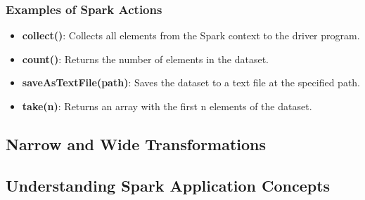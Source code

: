 \begin{frame}
  \frametitle{Examples of Spark Actions}
  \begin{itemize}
    \item \textbf{collect()}: Collects all elements from the Spark context to the driver program.
    \item \textbf{count()}: Returns the number of elements in the dataset.
    \item \textbf{saveAsTextFile(path)}: Saves the dataset to a text file at the specified path.
    \item \textbf{take(n)}: Returns an array with the first n elements of the dataset.
  \end{itemize}
\end{frame}

\subsection{Narrow and Wide Transformations}\label{subsec:narrow-and-wide-transformations}

\subsection{Understanding Spark Application Concepts}\label{subsec:understanding-spark-application-concepts}

